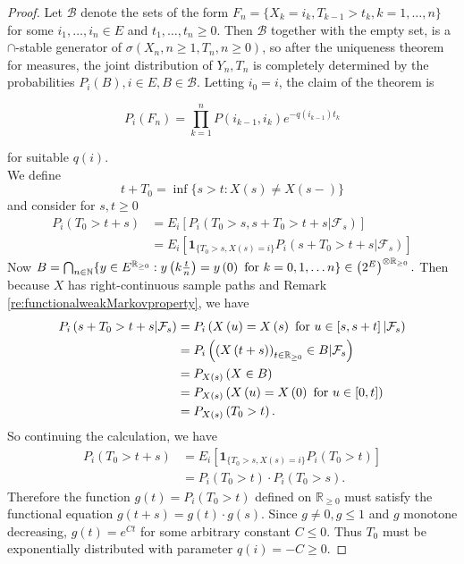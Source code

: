 \documentclass[12pt,a4paper]{scrartcl}
\numberwithin{equation}{section}
\newcommand{\R}{\mathbb{R}} %
\newcommand{\N}{\mathbb{N}} %
\begin{document}
\begin{proof}
Let $ \mathcal{B} $ denote the sets of the form $ F_n = \lbrace X_k = i_k, T_{k-1} > t_k, k=1,\ldots,n \rbrace  $ for some $i_1,\ldots,i_n \in E$ and $t_1,\ldots,t_n \geq 0 $. Then $ \mathcal{B}$ together with the empty set, is a $\cap$-stable generator of $\sigma\left(X_n, n \geq 1 , T_n, n \geq 0 \right)$, so after the uniqueness theorem for measures, the joint distribution of $ Y_n, T_n $ is completely determined by the probabilities $ P_i\left(B\right) , i \in E, B \in  \mathcal{B}. $
Letting $i_0 = i$, the claim of the theorem is

\begin{equation}
P_i\left(F_n\right) = \prod_{k=1}^n P\left(i_{k-1}, i_k\right) e^{-q\left(i_{k-1}\right)t_k }
\label{eq:equitoclaim}
\end{equation}

for suitable $q\left(i\right)$.\\[2ex]
We define
$$ t + T_0 = \inf\lbrace s > t: X\left(s\right) \neq X\left(s-\right)\rbrace  $$ and consider for $s,t \geq 0$
\begin{align*}
P_i\left(T_0 > t+s\right) &= E_i\left[ P_i\left(T_0 > s , s+T_0 > t+s | \mathcal{F}_s \right) \right] \\
&= E_i\left[\textbf{1}_{\lbrace T_0 > s, X\left(s\right) = i \rbrace} P_i\left(s+T_0 > t+s   | \mathcal{F}_s \right) \right]
\end{align*}
Now $B = \bigcap_{n \in \N} \lbrace y \in E^{\R_{\geq 0}}: y\left(k \frac{t}{n} \right) = y\left(0\right) \textnormal{ for } k=0,1,\ldots n \rbrace  \in \left(2^{E} \right)^{\otimes \R_{\geq 0}}.$
Then because $X$ has right-continuous sample paths and Remark \ref{re:functionalweakMarkovproperty}, we have
\begin{align*}
P_i\left(s+T_0 > t+s | \mathcal{F}_s \right) &= P_i\left(X\left(u\right) = X\left(s\right) \textnormal{ for } u \in \left[s,s+t \right] |\mathcal{F}_s\right) \\
&= P_i\left(\left(X\left(t+s\right) \right)_{t \in \R_{\geq 0}} \in B  | \mathcal{F}_s \right) \\
&= P_{X\left(s\right)}\left(X \in B \right) \\
&=P_{X\left(s\right)}\left(X\left(u\right) = X\left(0\right) \textnormal{ for } u \in \left[0,t\right] \right)\\
&= P_{X\left(s\right)}\left(T_0 > t\right).
\end{align*}
So continuing the calculation, we have
\begin{align*}
P_i\left(T_0 > t+s\right) &= E_i\left[\textbf{1}_{\lbrace T_0 > s, X\left(s\right) = i \rbrace} P_i\left(T_0 > t\right) \right] \\
&=P_i\left(T_0 > t\right) \cdot P_i\left(T_0 > s\right).
\end{align*}
Therefore the function $g\left(t\right) = P_i\left(T_0 > t\right)$ defined on $\R_{\geq 0}$ must satisfy the functional equation $g\left(t+s\right) = g\left(t\right) \cdot g\left(s\right).$ Since $g \neq 0, g \leq 1$ and $g$ monotone decreasing, $g\left(t\right) = e^{Ct}$ for some arbitrary constant $C \leq 0.$
Thus $T_0$ must be exponentially distributed with parameter $ q\left(i\right) = -C \geq 0 $. 


\end{proof}
\end{document}
